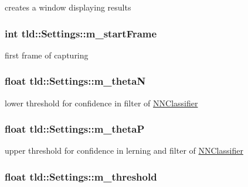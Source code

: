 creates a window displaying results 

\hypertarget{classtld_1_1Settings_ac63c6dfae7c0be1fc167608dd52e1d7f}{
\subsubsection[{m\-\_\-start\-Frame}]{\setlength{\rightskip}{0pt plus 5cm}int tld\-::\-Settings\-::m\-\_\-start\-Frame}}\label{classtld_1_1Settings_ac63c6dfae7c0be1fc167608dd52e1d7f}


first frame of capturing 

\hypertarget{classtld_1_1Settings_aef49627d1ffac7dda7cc83c7ba6a25bd}{
\subsubsection[{m\-\_\-theta\-N}]{\setlength{\rightskip}{0pt plus 5cm}float tld\-::\-Settings\-::m\-\_\-theta\-N}}\label{classtld_1_1Settings_aef49627d1ffac7dda7cc83c7ba6a25bd}


lower threshold for confidence in filter of \hyperlink{classtld_1_1NNClassifier}{N\-N\-Classifier} 

\hypertarget{classtld_1_1Settings_adade7d3269f34113e92abdb3816058f7}{
\subsubsection[{m\-\_\-theta\-P}]{\setlength{\rightskip}{0pt plus 5cm}float tld\-::\-Settings\-::m\-\_\-theta\-P}}\label{classtld_1_1Settings_adade7d3269f34113e92abdb3816058f7}


upper threshold for confidence in lerning and filter of \hyperlink{classtld_1_1NNClassifier}{N\-N\-Classifier} 

\hypertarget{classtld_1_1Settings_afc2357da344888ad2158cbb51f8eb377}{
\subsubsection[{m\-\_\-threshold}]{\setlength{\rightskip}{0pt plus 5cm}float tld\-::\-Settings\-::m\-\_\-threshold}}\label{classtld_1_1Settings_afc2357da344888ad2158cbb51f8eb377}


